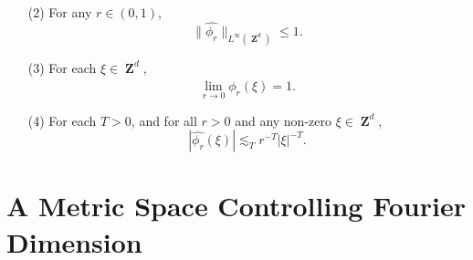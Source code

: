 \documentclass[12pt,reqno]{article}
\numberwithin{equation}{section}
\DeclareMathOperator{\ZZ}{\mathbf{Z}}
\DeclareMathOperator{\TT}{\mathbf{T}}
\numberwithin{theorem}{section}
\begin{document}
\begin{itemize}
\begin{enumerate}
    \item[(2)] For any $r \in (0,1)$,
    \begin{equation} \label{equationDIOJAOIJVIV23242}
        \| \widehat{\phi_r} \|_{L^\infty(\ZZ^d)} \leq 1.
    \end{equation}


    \item[(3)] For each $\xi \in \ZZ^d$,
    \begin{equation} \label{approximationtoidentitypointwiseconvergence}
        \lim_{r \to 0} \widehat{\phi_r}(\xi) = 1.
    \end{equation}

    \item[(4)] For each $T > 0$, and for all $r > 0$ and any non-zero $\xi \in \ZZ^d$,
    \begin{equation} \label{molificationdecaybound}
        |\widehat{\phi_r}(\xi)| \lesssim_T r^{-T} |\xi|^{-T}.
    \end{equation}
\end{enumerate}
\end{itemize}

\section{A Metric Space Controlling Fourier Dimension}
\end{document}
